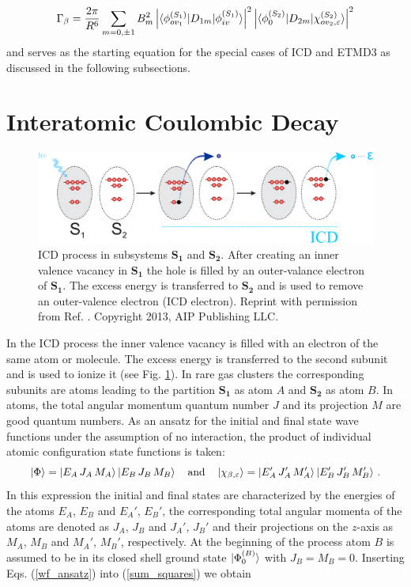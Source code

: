 \begin{align}
\label{sum_squares}
\Gamma_\beta
=  \frac{2\pi}{R^6}\sum\limits_{m=0,\pm 1}B_m^2 \left|
\braket{\phi_{ov_1}^{(S_1)}|{D}_{1m}|\phi_{iv}^{(S_1)}}\right|^2
\left|\braket{\phi_{0}^{(S_2)}|{D}_{2m}|\chi_{ov_2,\varepsilon}^{(S_2)}}\right|^2
\end{align}
and serves as the starting equation for the special cases of ICD and ETMD3
as discussed in the following subsections.

\section{Interatomic Coulombic Decay}
\label{subs_icd}

\begin{figure}[ht]
\centering
\includegraphics[scale=0.30]{pics/ICD_subsystems.eps}
\caption{ICD process in subsystems $\mathbf{S_1}$ and $\mathbf{S_2}$. After
         creating an inner valence vacancy in $\mathbf{S_1}$  the hole is filled
         by an outer-valance electron of $\mathbf{S_1}$. The excess energy is
         transferred to $\mathbf{S_2}$ and is used to remove an outer-valence
         electron (ICD electron). Reprint with permission 
         from Ref. \cite{Fasshauer13}. Copyright 2013, AIP Publishing LLC.}
\label{fancy_ICD}
\end{figure}

In the ICD process the inner valence vacancy is filled with an electron
of the same atom or molecule. The excess energy is transferred to the second
subunit and is used to ionize it (see Fig. \ref{fancy_ICD}). In rare gas
clusters the corresponding subunits are atoms leading to the partition
$\mathbf{S_1}$ as atom $A$ and $\mathbf{S_2}$ as atom $B$. In atoms,
the total angular momentum quantum number $J$ and its projection $M$ are
good quantum numbers. As an ansatz for the initial and final state wave
functions under the assumption of no interaction, the product of individual
atomic configuration state functions is taken:
\begin{equation}\label{wf_ansatz}
\ket{\Phi} =\ket{E_A\, J_A\, M_A}\ket{E_B\, J_B\, M_B}
\quad\mbox{and}\quad
\ket{\chi_{\beta,\varepsilon}} = \ket{E'_A\, J'_A\, M'_A}\ket{E'_B\,  J'_B\, M_B'}\, .
\end{equation}
In this expression the initial and final states are characterized by the
energies of the atoms $E_A$, $E_B$ and $E_A'$, $E_B'$, the corresponding
total angular momenta of the atoms are denoted as $J_A$, $J_B$ and
$J_A'$, $J_B'$ and their projections on the $z$-axis as $M_A$, $M_B$ and
$M_A'$, $M_B'$, respectively. At the beginning of the process atom $B$ is
assumed to be in its closed shell ground state $\ket{\Phi_0^{(B)}}$ with
$J_B=M_B=0$. Inserting Eqs. (\ref{wf_ansatz}) into (\ref{sum_squares})
we obtain


